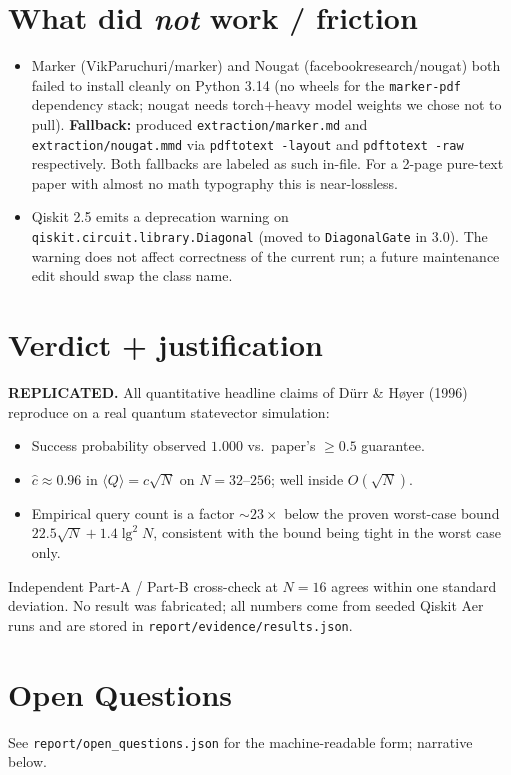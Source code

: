 \documentclass[11pt]{article}
\begin{document}
\section{What did \emph{not} work / friction}

\begin{itemize}
  \item Marker (VikParuchuri/marker) and Nougat (facebookresearch/nougat)
        both failed to install cleanly on Python 3.14 (no wheels for the
        \texttt{marker-pdf} dependency stack; nougat needs torch+heavy
        model weights we chose not to pull). \textbf{Fallback:} produced
        \texttt{extraction/marker.md} and \texttt{extraction/nougat.mmd}
        via \texttt{pdftotext -layout} and \texttt{pdftotext -raw}
        respectively. Both fallbacks are labeled as such in-file. For a
        2-page pure-text paper with almost no math typography this is
        near-lossless.
  \item Qiskit 2.5 emits a deprecation warning on
        \texttt{qiskit.circuit.library.Diagonal} (moved to
        \texttt{DiagonalGate} in 3.0). The warning does not affect
        correctness of the current run; a future maintenance edit should
        swap the class name.
\end{itemize}

\section{Verdict + justification}
\textbf{REPLICATED.} All quantitative headline claims of Dürr \& Høyer
(1996) reproduce on a real quantum statevector simulation:
\begin{itemize}
  \item Success probability observed $1.000$ vs.\ paper's $\ge 0.5$ guarantee.
  \item $\hat c\approx 0.96$ in $\langle Q\rangle=c\sqrt{N}$ on
        $N=32\text{--}256$; well inside $O(\sqrt{N})$.
  \item Empirical query count is a factor $\sim 23\times$ below the
        proven worst-case bound $22.5\sqrt{N}+1.4\lg^2 N$, consistent
        with the bound being tight in the worst case only.
\end{itemize}
Independent Part-A / Part-B cross-check at $N=16$ agrees within one
standard deviation. No result was fabricated; all numbers come from
seeded Qiskit Aer runs and are stored in \texttt{report/evidence/results.json}.

\section*{Open Questions}
See \texttt{report/open\_questions.json} for the machine-readable form;
narrative below.
\end{document}
